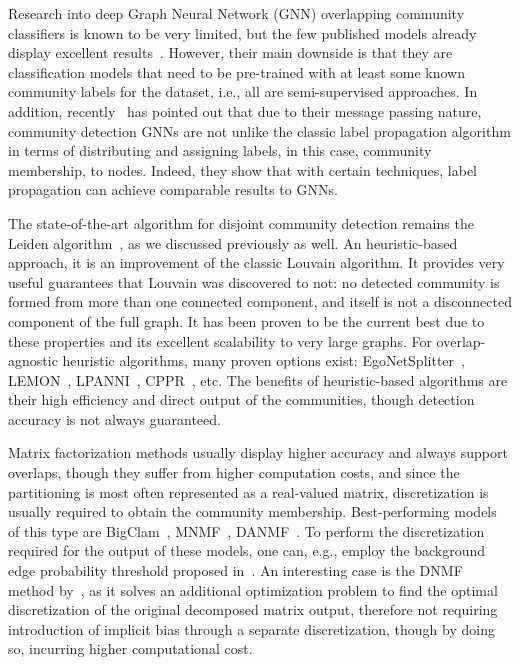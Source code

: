 Research into deep Graph Neural Network (GNN) overlapping community classifiers is known to be very limited, but the few published models already display excellent results~\cite{jia_communitygan_2019, wang_unifying_2020}. However, their main downside is that they are classification models that need to be pre-trained with at least some known community labels for the dataset, i.e., all are semi-supervised approaches. In addition, recently~\cite{huang_combining_2020} has pointed out that due to their message passing nature, community detection GNNs are not unlike the classic label propagation algorithm in terms of distributing and assigning labels, in this case, community membership, to nodes. Indeed, they show that with certain techniques, label propagation can achieve comparable results to GNNs.

The state-of-the-art algorithm for disjoint community detection remains the Leiden algorithm~\cite{traag_louvain_2019}, as we discussed previously as well. An heuristic-based approach, it is an improvement of the classic Louvain algorithm. It provides very useful guarantees that Louvain was discovered to not: no detected community is formed from more than one connected component, and itself is not a disconnected component of the full graph. It has been proven to be the current best due to these properties and its excellent scalability to very large graphs. For overlap-agnostic heuristic algorithms, many proven options exist: EgoNetSplitter~\cite{epasto_ego-splitting_2017}, LEMON~\cite{li_local_2018}, LPANNI~\cite{lu_lpanni_2019}, CPPR~\cite{gao_overlapping_2021}, etc. The benefits of heuristic-based algorithms are their high efficiency and direct output of the communities, though detection accuracy is not always guaranteed.

Matrix factorization methods usually display higher accuracy and always support overlaps, though they suffer from higher computation costs, and since the partitioning is most often represented as a real-valued matrix, discretization is usually required to obtain the community membership. Best-performing models of this type are BigClam~\cite{yang_overlapping_2013}, MNMF~\cite{wang_community_2017}, DANMF~\cite{ye_deep_2018}. To perform the discretization required for the output of these models, one can, e.g., employ the background edge probability threshold proposed in~\cite{jia_communitygan_2019}. An interesting case is the DNMF method by~\cite{ye_discrete_2019}, as it solves an additional optimization problem to find the optimal discretization of the original decomposed matrix output, therefore not requiring introduction of implicit bias through a separate discretization, though by doing so, incurring higher computational cost.

